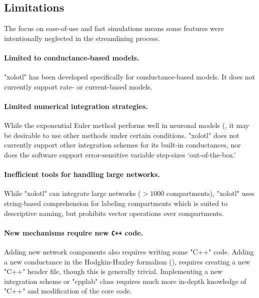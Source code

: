 \documentclass{frontiersSCNS} %
\begin{document}
\subsection{Limitations}
\label{limitations}

The focus on ease-of-use and fast simulations means some features were intentionally neglected in the streamlining process. 

\paragraph{Limited to conductance-based models.} "xolotl" has been developed specifically for conductance-based models. It does not currently support rate- or current-based models.

\paragraph{Limited numerical integration strategies.} While the exponential Euler method performs well in neuronal models (\cite{ohErrorAnalysisSpecialized2006, dayanTheoreticalNeuroscience2001}, it may be desirable to use other methods under certain conditions. "xolotl" does not currently support other integration schemes for its built-in conductances, nor does the software support error-sensitive variable step-sizes `out-of-the-box.'

\paragraph{Inefficient tools for handling large networks.} While "xolotl" can integrate large networks ($>1000$ compartments), "xolotl" uses string-based comprehension for labeling compartments which is suited to descriptive naming, but prohibits vector operations over compartments.

\paragraph{New mechanisms require new \texttt{C++} code.} Adding new network components also requires writing some "C++" code. Adding a new conductance in the Hodgkin-Huxley formalism (\cite{hodgkinMeasurementCurrentvoltageRelations1952, dayanTheoreticalNeuroscience2001}), requires creating a new "C++" header file, though this is generally trivial. Implementing a new integration scheme or "cpplab" class requires much more in-depth knowledge of "C++" and modification of the core code.
\end{document}
